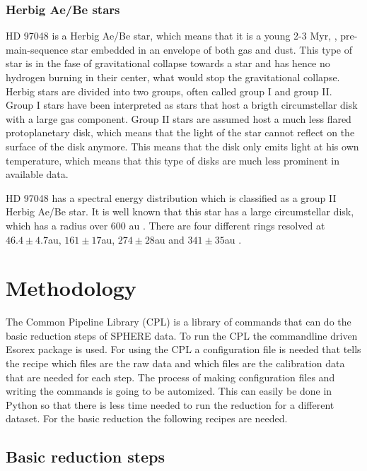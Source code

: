 \documentclass[twoside,single]{lion-msc}
\begin{document}
\subsection{Herbig Ae/Be stars}
HD 97048 is a Herbig Ae/Be star, which means that it is a young 2-3 Myr, \cite{VanDenAncker1998}, pre-main-sequence star embedded in an envelope of both gas and dust. This type of star is in the fase of gravitational collapse towards a star and has hence no hydrogen burning in their center, what would stop the gravitational collapse. Herbig stars are divided into two groups, often called group I and group II. Group I stars have been interpreted as stars that host a brigth circumstellar disk with a large gas component. Group II stars are assumed host a much less flared protoplanetary disk, which means that the light of the star cannot reflect on the surface of the disk anymore. This means that the disk only emits light at his own temperature, which means that this type of disks are much less prominent in available data.
\bigskip 

HD 97048 has a spectral energy distribution which is classified as a group II Herbig Ae/Be star. It is well known that this star has a large circumstellar disk, which has a radius over 600 au \cite{Doering2007}. There are four different rings resolved at $46.4\pm 4.7$au, $161\pm 17$au,	$274\pm 28$au and $341\pm 35$au \cite{Ginski2016}.

\chapter{Methodology}
The Common Pipeline Library (CPL) is a library of commands that can do the basic reduction steps of SPHERE data. To run the CPL the commandline driven Esorex package is used. For using the CPL a configuration file is needed that tells the recipe which files are the raw data and which files are the calibration data that are needed for each step. The process of making configuration files and writing the commands is going to be automized. This can easily be done in Python so that there is less time needed to run the reduction for a different dataset. For the basic reduction the following recipes are needed.

\clearpage

\section{Basic reduction steps}
\end{document}
